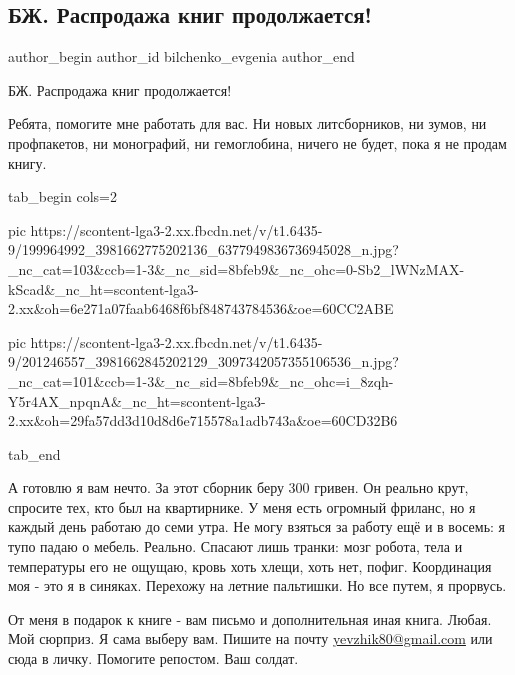 
 
 
 
 
 
\subsection{БЖ. Распродажа книг продолжается!}
\label{sec:15_06_2021.fb.bilchenko_evgenia.2.rasprodazha_knig}
\ifcmt
 author_begin
   author_id bilchenko_evgenia
 author_end
\fi

БЖ. Распродажа книг продолжается! 

Ребята, помогите мне работать для вас. Ни новых литсборников, ни зумов, ни
профпакетов, ни монографий, ни гемоглобина, ничего не будет, пока я не продам
книгу. 

\ifcmt
  tab_begin cols=2

     pic https://scontent-lga3-2.xx.fbcdn.net/v/t1.6435-9/199964992_3981662775202136_6377949836736945028_n.jpg?_nc_cat=103&ccb=1-3&_nc_sid=8bfeb9&_nc_ohc=0-Sb2_lWNzMAX-kScad&_nc_ht=scontent-lga3-2.xx&oh=6e271a07faab6468f6bf848743784536&oe=60CC2ABE

     pic https://scontent-lga3-2.xx.fbcdn.net/v/t1.6435-9/201246557_3981662845202129_3097342057355106536_n.jpg?_nc_cat=101&ccb=1-3&_nc_sid=8bfeb9&_nc_ohc=i_8zqh-Y5r4AX_npqnA&_nc_ht=scontent-lga3-2.xx&oh=29fa57dd3d10d8d6e715578a1adb743a&oe=60CD32B6

  tab_end
\fi

А готовлю я вам нечто. За этот сборник беру 300 гривен. Он реально крут,
спросите тех, кто был на квартирнике.  У меня есть огромный фриланс, но я
каждый день работаю до семи утра. Не могу взяться за работу ещё и в восемь: я
тупо падаю о мебель. Реально. Спасают лишь транки: мозг робота, тела и
температуры его не ощущаю, кровь хоть хлещи, хоть нет, пофиг. Координация моя -
это я в синяках. Перехожу на летние пальтишки. Но все путем, я прорвусь. 

От меня в подарок к книге - вам письмо и дополнительная иная книга. Любая. Мой
сюрприз. Я сама выберу вам. Пишите на почту \url{yevzhik80@gmail.com} или сюда в
личку. Помогите репостом. Ваш солдат.
